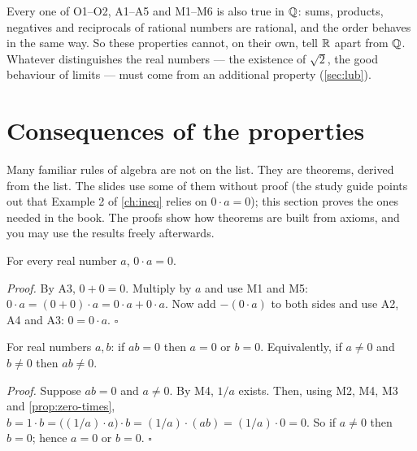 \begin{note}
Every one of O1--O2, A1--A5 and M1--M6 is also true in $\mathbb{Q}$: sums, products, negatives and reciprocals of
rational numbers are rational, and the order behaves in the same way.  So these properties
cannot, on their own, tell $\mathbb{R}$ apart from $\mathbb{Q}$. Whatever distinguishes the real numbers --- the existence of
$\sqrt2$, the good behaviour of limits --- must come from an additional property (\cref{sec:lub}).
\end{note}

\section{Consequences of the properties}\label{sec:consequences}

Many familiar rules of algebra are not on the list. They are theorems, derived from the list. The slides use
some of them without proof (the study guide points out that Example 2 of \cref{ch:ineq} relies on $0\cdot a=0$);
this section proves the ones needed in the book. The proofs show how theorems are built from axioms, and you
may use the results freely afterwards.

\begin{proposition}
For every real number $a$, $0\cdot a=0$.
\end{proposition}
\emph{Proof.} By A3, $0+0=0$. Multiply by $a$ and use M1 and M5:
$0\cdot a=(0+0)\cdot a=0\cdot a+0\cdot a$. Now add $-(0\cdot a)$ to both sides and use A2, A4 and A3:
$0=0\cdot a$. \hfill$\square$

\begin{proposition}
For real numbers $a,b$: if $ab=0$ then $a=0$ or $b=0$. Equivalently, if $a\ne0$ and $b\ne0$ then $ab\ne0$.
\end{proposition}
\emph{Proof.} Suppose $ab=0$ and $a\ne0$. By M4, $1/a$ exists. Then, using M2, M4, M3 and
\cref{prop:zero-times},
$b=1\cdot b=\big((1/a)\cdot a\big)\cdot b=(1/a)\cdot(ab)=(1/a)\cdot0=0$. So if $a\ne0$ then $b=0$; hence
$a=0$ or $b=0$. \hfill$\square$

